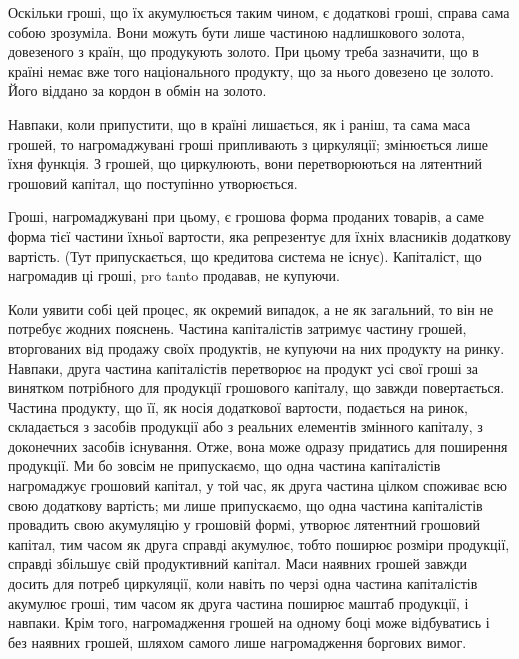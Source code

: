Оскільки гроші, що їх акумулюється таким чином, є додаткові гроші,
справа сама собою зрозуміла. Вони можуть бути лише частиною надлишкового
золота, довезеного з країн, що продукують золото. При цьому
треба зазначити, що в країні немає вже того національного продукту,
що за нього довезено це золото. Його віддано за кордон в обмін на
золото.

Навпаки, коли припустити, що в країні лишається, як і раніш, та сама
маса грошей, то нагромаджувані гроші припливають з циркуляції; змінюється
лише їхня функція. З грошей, що циркулюють, вони перетворюються
на лятентний грошовий капітал, що поступінно утворюється.

Гроші, нагромаджувані при цьому, є грошова форма проданих товарів,
а саме форма тієї частини їхньої вартости, яка репрезентує для їхніх
власників додаткову вартість. (Тут припускається, що кредитова система
не існує). Капіталіст, що нагромадив ці гроші, pro tanto продавав, не
купуючи.

Коли уявити собі цей процес, як окремий випадок, а не як загальний,
то він не потребує жодних пояснень. Частина капіталістів затримує частину
грошей, вторгованих від продажу своїх продуктів, не купуючи на
них продукту на ринку. Навпаки, друга частина капіталістів перетворює
на продукт усі свої гроші за винятком потрібного для продукції грошового
капіталу, що завжди повертається. Частина продукту, що її, як носія
додаткової вартости, подається на ринок, складається з засобів продукції
або з реальних елементів змінного капіталу, з доконечних засобів існування.
Отже, вона може одразу придатись для поширення продукції.
Ми бо зовсім не припускаємо, що одна частина капіталістів нагромаджує
грошовий капітал, у той час, як друга частина цілком споживає всю свою
додаткову вартість; ми лише припускаємо, що одна частина капіталістів
провадить свою акумуляцію у грошовій формі, утворює лятентний грошовий
капітал, тим часом як друга справді акумулює, тобто поширює розміри
продукції, справді збільшує свій продуктивний капітал. Маси наявних
грошей завжди досить для потреб циркуляції, коли навіть по черзі одна
частина капіталістів акумулює гроші, тим часом як друга частина поширює
маштаб продукції, і навпаки. Крім того, нагромадження грошей на одному
боці може відбуватись і без наявних грошей, шляхом самого лише нагромадження
боргових вимог.


